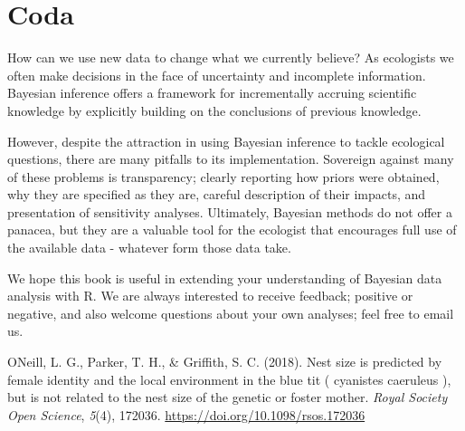 \documentclass[
]{book}
\newlength{\cslhangindent}
\newlength{\cslentryspacingunit} %
\newenvironment{CSLReferences}[2] %
 {%
  \setlength{\parindent}{0pt}
  \ifodd #1
  \let\oldpar\par
  \def\par{\hangindent=\cslhangindent\oldpar}
  \fi
  \setlength{\parskip}{#2\cslentryspacingunit}
 }%
 {}
\begin{document}
\hypertarget{coda}{%
\chapter{Coda}\label{coda}}

How can we use new data to change what we currently believe? As
ecologists we often make decisions in the face of uncertainty and
incomplete information. Bayesian inference offers a framework for
incrementally accruing scientific knowledge by explicitly building on
the conclusions of previous knowledge.

However, despite the attraction in using Bayesian inference to tackle
ecological questions, there are many pitfalls to its implementation.
Sovereign against many of these problems is transparency; clearly
reporting how priors were obtained, why they are specified as they are,
careful description of their impacts, and presentation of sensitivity
analyses. Ultimately, Bayesian methods do not offer a panacea, but they
are a valuable tool for the ecologist that encourages full use of the
available data - whatever form those data take.

We hope this book is useful in extending your understanding of Bayesian
data analysis with R. We are always interested to receive feedback;
positive or negative, and also welcome questions about your own
analyses; feel free to email us.

\hypertarget{refs}{}
\begin{CSLReferences}{1}{0}
\leavevmode{}%
ONeill, L. G., Parker, T. H., \& Griffith, S. C. (2018). Nest size is
predicted by female identity and the local environment in the blue tit (
cyanistes caeruleus ), but is not related to the nest size of the
genetic or foster mother. \emph{Royal Society Open Science},
\emph{5}(4), 172036. \url{https://doi.org/10.1098/rsos.172036}

\end{CSLReferences}

\backmatter
\end{document}
